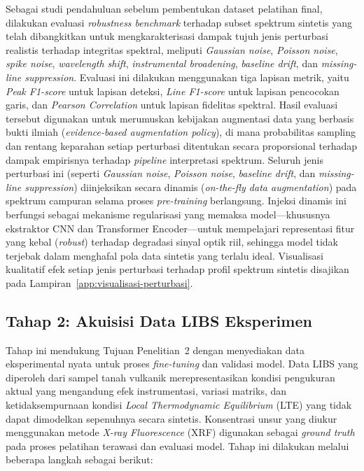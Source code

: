 Sebagai studi pendahuluan sebelum pembentukan dataset pelatihan final, dilakukan evaluasi \textit{robustness benchmark} terhadap subset spektrum sintetis yang telah dibangkitkan untuk mengkarakterisasi dampak tujuh jenis perturbasi realistis terhadap integritas spektral, meliputi \textit{Gaussian noise}, \textit{Poisson noise}, \textit{spike noise}, \textit{wavelength shift}, \textit{instrumental broadening}, \textit{baseline drift}, dan \textit{missing-line suppression}. Evaluasi ini dilakukan menggunakan tiga lapisan metrik, yaitu \textit{Peak F1-score} untuk lapisan deteksi, \textit{Line F1-score} untuk lapisan pencocokan garis, dan \textit{Pearson Correlation} untuk lapisan fidelitas spektral. Hasil evaluasi tersebut digunakan untuk merumuskan kebijakan augmentasi data yang berbasis bukti ilmiah (\textit{evidence-based augmentation policy}), di mana probabilitas sampling dan rentang keparahan setiap perturbasi ditentukan secara proporsional terhadap dampak empirisnya terhadap \textit{pipeline} interpretasi spektrum. Seluruh jenis perturbasi ini (seperti \textit{Gaussian noise}, \textit{Poisson noise}, \textit{baseline drift}, dan \textit{missing-line suppression}) diinjeksikan secara dinamis (\textit{on-the-fly data augmentation}) pada spektrum campuran selama proses \textit{pre-training} berlangsung. Injeksi dinamis ini berfungsi sebagai mekanisme regularisasi yang memaksa model---khususnya ekstraktor CNN dan Transformer Encoder---untuk mempelajari representasi fitur yang kebal (\textit{robust}) terhadap degradasi sinyal optik riil, sehingga model tidak terjebak dalam menghafal pola data sintetis yang terlalu ideal. Visualisasi kualitatif efek setiap jenis perturbasi terhadap profil spektrum sintetis disajikan pada Lampiran~\ref{app:visualisasi-perturbasi}.

\subsection{Tahap 2: Akuisisi Data LIBS Eksperimen}
Tahap ini mendukung Tujuan Penelitian~2 dengan menyediakan data eksperimental nyata untuk proses \textit{fine-tuning} dan validasi model. Data LIBS yang diperoleh dari sampel tanah vulkanik merepresentasikan kondisi pengukuran aktual yang mengandung efek instrumentasi, variasi matriks, dan ketidaksempurnaan kondisi \textit{Local Thermodynamic Equilibrium} (LTE) yang tidak dapat dimodelkan sepenuhnya secara sintetis. Konsentrasi unsur yang diukur menggunakan metode \textit{X-ray Fluorescence} (XRF) digunakan sebagai \textit{ground truth} pada proses pelatihan terawasi dan evaluasi model. Tahap ini dilakukan melalui beberapa langkah sebagai berikut:

